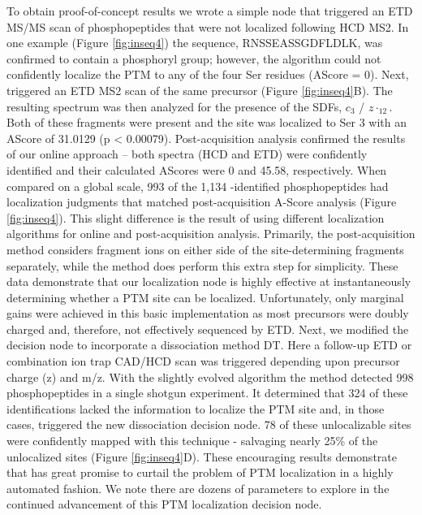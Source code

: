To obtain proof-of-concept results we wrote a simple \inseq{} node that triggered an ETD MS/MS scan of phosphopeptides that were not localized following HCD MS2. In one example (Figure \ref{fig:inseq4}) the sequence, RNSSEASSGDFLDLK, was confirmed to contain a phosphoryl group; however, the \inseq{} algorithm could not confidently localize the PTM to any of the four Ser residues (AScore = 0). Next, \inseq{} triggered an ETD MS2 scan of the same precursor (Figure \ref{fig:inseq4}B). The resulting spectrum was then analyzed for the presence of the SDFs, $c_3$ / $z\cdot_{12}$. Both of these fragments were present and the site was localized to Ser 3 with an AScore of 31.0129 (p < 0.00079). Post-acquisition analysis confirmed the results of our online \inseq{} approach – both spectra (HCD and ETD) were confidently identified and their calculated AScores were 0 and 45.58, respectively. When compared on a global scale, 993 of the 1,134 \inseq{}-identified phosphopeptides had localization judgments that matched post-acquisition A-Score analysis (Figure \ref{fig:inseq4}). This slight difference is the result of using different localization algorithms for online and post-acquisition analysis. Primarily, the post-acquisition method considers fragment ions on either side of the site-determining fragments separately, while the \inseq{} method does perform this extra step for simplicity.\cite{esips,ascore} These data demonstrate that our localization node is highly effective at instantaneously determining whether a PTM site can be localized. Unfortunately, only marginal gains were achieved in this basic implementation as most precursors were doubly charged and, therefore, not effectively sequenced by ETD. Next, we modified the \inseq{} decision node to incorporate a dissociation method DT. Here a follow-up ETD or combination ion trap CAD/HCD scan was triggered depending upon precursor charge (z) and m/z. With the slightly evolved algorithm the \inseq{} method detected 998 phosphopeptides in a single shotgun experiment. It determined that 324 of these identifications lacked the information to localize the PTM site and, in those cases, triggered the new dissociation decision node. 78 of these unlocalizable sites were confidently mapped with this technique - salvaging nearly 25\% of the unlocalized sites (Figure \ref{fig:inseq4}D). These encouraging results demonstrate that \inseq{} has great promise to curtail the problem of PTM localization in a highly automated fashion. We note there are dozens of parameters to explore in the continued advancement of this PTM localization decision node.

